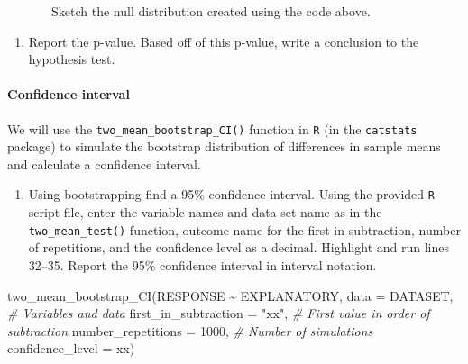 \documentclass[
]{report}
\newenvironment{Shaded}{\begin{snugshade}}{\end{snugshade}}
\newcommand{\AttributeTok}[1]{\textcolor[rgb]{0.77,0.63,0.00}{#1}}
\newcommand{\CommentTok}[1]{\textcolor[rgb]{0.56,0.35,0.01}{\textit{#1}}}
\newcommand{\DecValTok}[1]{\textcolor[rgb]{0.00,0.00,0.81}{#1}}
\newcommand{\FunctionTok}[1]{\textcolor[rgb]{0.00,0.00,0.00}{#1}}
\newcommand{\NormalTok}[1]{#1}
\newcommand{\SpecialCharTok}[1]{\textcolor[rgb]{0.00,0.00,0.00}{#1}}
\newcommand{\StringTok}[1]{\textcolor[rgb]{0.31,0.60,0.02}{#1}}
\providecommand{\tightlist}{%
  \setlength{\itemsep}{0pt}\setlength{\parskip}{0pt}}
\begin{document}
~~~~~~~Sketch the null distribution created using the code above.

\vspace{1.5in}

\begin{enumerate}
\def\labelenumi{\arabic{enumi}.}
\setcounter{enumi}{16}
\tightlist
\item
  Report the p-value. Based off of this p-value, write a conclusion to the hypothesis test.
\end{enumerate}

\vspace{0.9in}

\hypertarget{confidence-interval-1}{%
\paragraph*{Confidence interval}\label{confidence-interval-1}}

We will use the \texttt{two\_mean\_bootstrap\_CI()} function in \texttt{R} (in the \texttt{catstats} package) to simulate the bootstrap distribution of differences in sample means and calculate a confidence interval.

\begin{enumerate}
\def\labelenumi{\arabic{enumi}.}
\setcounter{enumi}{17}
\tightlist
\item
  Using bootstrapping find a 95\% confidence interval. Using the provided \texttt{R} script file, enter the variable names and data set name as in the \texttt{two\_mean\_test()} function, outcome name for the first in subtraction, number of repetitions, and the confidence level as a decimal. Highlight and run lines 32--35. Report the 95\% confidence interval in interval notation.
\end{enumerate}

\begin{Shaded}
\begin{Highlighting}[]
\FunctionTok{two\_mean\_bootstrap\_CI}\NormalTok{(RESPONSE }\SpecialCharTok{\textasciitilde{}}\NormalTok{ EXPLANATORY, }\AttributeTok{data =}\NormalTok{ DATASET,  }\CommentTok{\# Variables and data}
                      \AttributeTok{first\_in\_subtraction =} \StringTok{"xx"}\NormalTok{, }\CommentTok{\# First value in order of subtraction}
                      \AttributeTok{number\_repetitions =} \DecValTok{1000}\NormalTok{,  }\CommentTok{\# Number of simulations}
                      \AttributeTok{confidence\_level =}\NormalTok{ xx)}
\end{Highlighting}
\end{Shaded}
\end{document}
